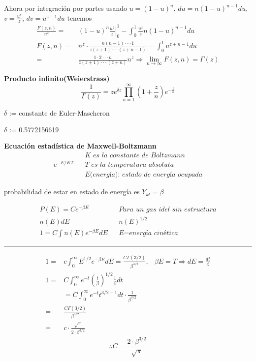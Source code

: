 \documentclass{article}
\theoremstyle{definition}
\begin{document}
Ahora por integración por partes usando $u=(1-u)^n$, $du=n(1-u)^{n-1}du$, $v=\frac{u^z}{z}$, $dv=u^{z-1}du$ tenemos
\[
\begin{array}{rl}
	\frac{F(z,n)}{n^z}=& (1-u)^n \left.\frac{u^z}{z}\right|^1_0-\int^1_0\frac{u^z}{z} n(1-u)^{n-1}du\\
	F(z,n)=& n^z\cdot \frac{n(n-1)\cdot\cdot\cdot 1}{z(z+1)\cdot\cdot\cdot (z+n-1)}=\int^1_0u^{z+n-1}du\\
	=& \frac{1\cdot 2\cdot\cdot\cdot n}{z(z+1)\cdot\cdot\cdot (z+n)}n^z\Rightarrow\lim\limits_{n\to \infty}F(z,n)=\Gamma (z)
\end{array}\]

\textbf{Producto infinito(Weierstrass)}
\[\frac{1}{\Gamma (z)}= z e^{\delta z} \prod^{\infty}_{n=1}\left(1+\frac{z}{n}\right)e^{-\frac{z}{n}}\]
\begin{center}
	$\delta$ := constante de Euler-Mascheron
	
	$\delta$ := 0.5772156619
\end{center}

\textbf{Ecuación estadística de Maxwell-Boltzmann}
\[\begin{array}{lcl}
	&& \textit{K es la constante de Boltzmann}\\
	e^{-E/KT} && \textit{T es la temperatura absoluta}\\
	&& \textit{E(energía): estado de energía ocupada}

\end{array}\]

probabilidad de estar en estado de energía es $Y_{kt}=\beta$

\[\begin{array}{lcl}
	P(E)=Ce^{-\beta E} && \textit{Para un gas idel sin estructura}\\
	n(E)dE && n(E)^{1/2}\\
	1=C\int n(E) e^{-\beta E}dE && \textit{E=energía cinética}
\end{array}\]
\par\noindent\rule{\textwidth}{0.5pt}
\[
\begin{array}{rlr}
	1=& c\int^{\infty}_0 E^{1/2}e^{-\beta E}dE=\frac{C\Gamma (3/2)}{\beta^{3/2}},& \beta E = T\Rightarrow dE=\frac{dt}{\beta}\\
	1=& C\int^{\infty}_0 e^{-t}\left(\frac{t}{\beta}\right)^{1/2}\frac{1}{\beta} dt\\
	&= C \int^{\infty}_0 e^{-t} t^{3/2-1}dt\cdot\frac{1}{\beta^{3/2}}\\
	=& \frac{C\Gamma (3/2)}{\beta^{3/2}}\\
	=& c\cdot\frac{\sqrt{\pi}}{2\cdot\beta^{3/2}}
\end{array}\]
\[\therefore C= \frac{2\cdot \beta^{3/2}}{\sqrt{\pi}}\]
\newpage
\end{document}
